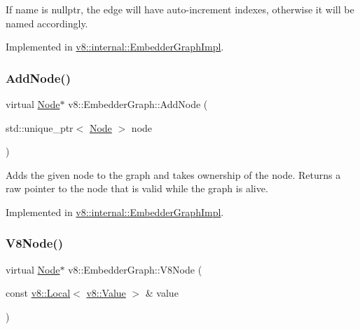 If name is nullptr, the edge will have auto-\/increment indexes, otherwise it will be named accordingly. 

Implemented in \mbox{\hyperlink{classv8_1_1internal_1_1EmbedderGraphImpl_ab15bea64bca0bb2185d9cf046f0547d8}{v8\+::internal\+::\+Embedder\+Graph\+Impl}}.

\mbox{\label{classv8_1_1EmbedderGraph_a57afbce6126e5cd82b66f66b018a18e2}} 
\subsubsection{\texorpdfstring{Add\+Node()}{AddNode()}}
{\footnotesize\ttfamily virtual \mbox{\hyperlink{classv8_1_1EmbedderGraph_1_1Node}{Node}}$\ast$ v8\+::\+Embedder\+Graph\+::\+Add\+Node (\begin{DoxyParamCaption}\item[{std\+::unique\+\_\+ptr$<$ \mbox{\hyperlink{classv8_1_1EmbedderGraph_1_1Node}{Node}} $>$}]{node }\end{DoxyParamCaption})\hspace{0.3cm}{\ttfamily [pure virtual]}}

Adds the given node to the graph and takes ownership of the node. Returns a raw pointer to the node that is valid while the graph is alive. 

Implemented in \mbox{\hyperlink{classv8_1_1internal_1_1EmbedderGraphImpl_a13ad2b317c1c89b9647af9ec9f006c7f}{v8\+::internal\+::\+Embedder\+Graph\+Impl}}.

\mbox{\label{classv8_1_1EmbedderGraph_a6fdb5451611738dd44c70d195445d0ff}} 
\subsubsection{\texorpdfstring{V8\+Node()}{V8Node()}}
{\footnotesize\ttfamily virtual \mbox{\hyperlink{classv8_1_1EmbedderGraph_1_1Node}{Node}}$\ast$ v8\+::\+Embedder\+Graph\+::\+V8\+Node (\begin{DoxyParamCaption}\item[{const \mbox{\hyperlink{classv8_1_1Local}{v8\+::\+Local}}$<$ \mbox{\hyperlink{classv8_1_1Value}{v8\+::\+Value}} $>$ \&}]{value }\end{DoxyParamCaption})\hspace{0.3cm}{\ttfamily [pure virtual]}}

